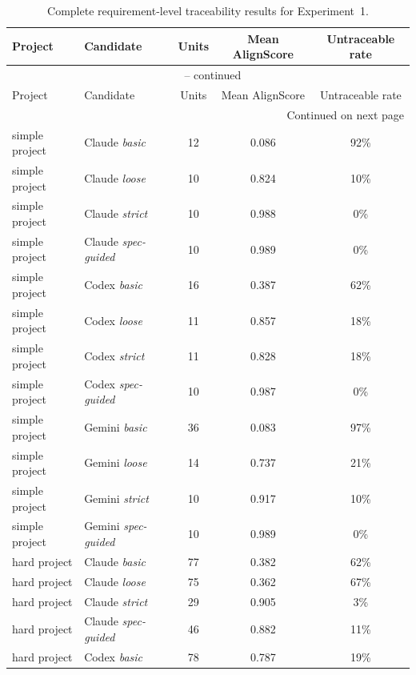 \begin{longtable}{@{}llccc@{}}
  \caption{Complete requirement-level traceability results for
  Experiment~1.}
  \label{tab:full-results-appendix} \\
  \toprule
  Project & Candidate & Units & Mean AlignScore & Untraceable rate \\
  \midrule
  \endfirsthead
  \multicolumn{5}{c}{\tablename\ \thetable{} -- continued} \\
  \toprule
  Project & Candidate & Units & Mean AlignScore & Untraceable rate \\
  \midrule
  \endhead
  \midrule \multicolumn{5}{r}{Continued on next page} \\
  \endfoot
  \bottomrule
  \endlastfoot
  simple project & Claude \emph{basic}        & 12 & 0.086 & 92\% \\
  simple project & Claude \emph{loose}        & 10 & 0.824 & 10\% \\
  simple project & Claude \emph{strict}       & 10 & 0.988 &  0\% \\
  simple project & Claude \emph{spec-guided}  & 10 & 0.989 &  0\% \\
  simple project & Codex \emph{basic}         & 16 & 0.387 & 62\% \\
  simple project & Codex \emph{loose}         & 11 & 0.857 & 18\% \\
  simple project & Codex \emph{strict}        & 11 & 0.828 & 18\% \\
  simple project & Codex \emph{spec-guided}   & 10 & 0.987 &  0\% \\
  simple project & Gemini \emph{basic}        & 36 & 0.083 & 97\% \\
  simple project & Gemini \emph{loose}        & 14 & 0.737 & 21\% \\
  simple project & Gemini \emph{strict}       & 10 & 0.917 & 10\% \\
  simple project & Gemini \emph{spec-guided}  & 10 & 0.989 &  0\% \\
  \midrule
  hard project & Claude \emph{basic}          & 77 & 0.382 & 62\% \\
  hard project & Claude \emph{loose}          & 75 & 0.362 & 67\% \\
  hard project & Claude \emph{strict}         & 29 & 0.905 &  3\% \\
  hard project & Claude \emph{spec-guided}    & 46 & 0.882 & 11\% \\
  hard project & Codex \emph{basic}           & 78 & 0.787 & 19\% \\

\end{longtable}
